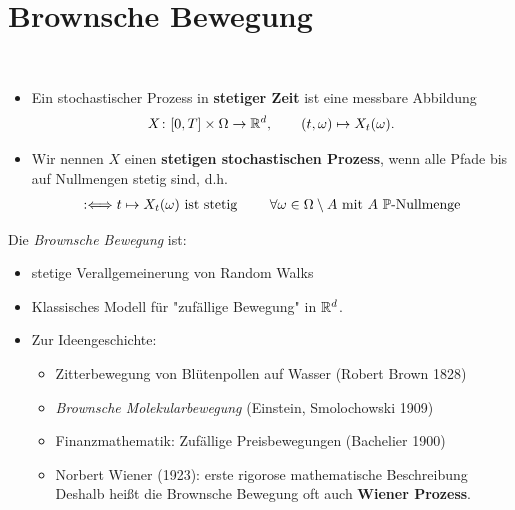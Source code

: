 
\chapter{Brownsche Bewegung} %

\begin{defi}\ %
	\begin{itemize}
		\item Ein stochastischer Prozess in \textbf{stetiger Zeit} ist eine messbare Abbildung 
\begin{align*}
	X\colon[0,T]\times\Omega\to\R^d,\qquad(t,\omega)\mapsto X_t(\omega).
\end{align*}
		\item Wir nennen $X$ einen \textbf{stetigen stochastischen Prozess}, wenn alle Pfade bis auf Nullmengen stetig sind, d.h.
		\begin{align*}
		:\Longleftrightarrow t\mapsto X_t(\omega)\text{ ist stetig }\qquad\forall \omega\in\Omega\setminus A \mit A~\P\text{-Nullmenge}
		\end{align*}
	\end{itemize}
\end{defi}

Die \textit{Brownsche Bewegung} ist:
\begin{itemize}
	\item stetige Verallgemeinerung von Random Walks
	\item Klassisches Modell für "zufällige Bewegung" in $\R^d$.
	\item Zur Ideengeschichte: 
	\begin{itemize}
		\item Zitterbewegung von Blütenpollen auf Wasser (Robert Brown 1828)
		\item \textit{Brownsche Molekularbewegung} (Einstein, Smolochowski 1909)
		\item Finanzmathematik: Zufällige Preisbewegungen (Bachelier 1900)
		\item Norbert Wiener (1923): erste rigorose mathematische Beschreibung\\
		Deshalb heißt die Brownsche Bewegung oft auch \textbf{Wiener Prozess}.
	\end{itemize}		
\end{itemize}

